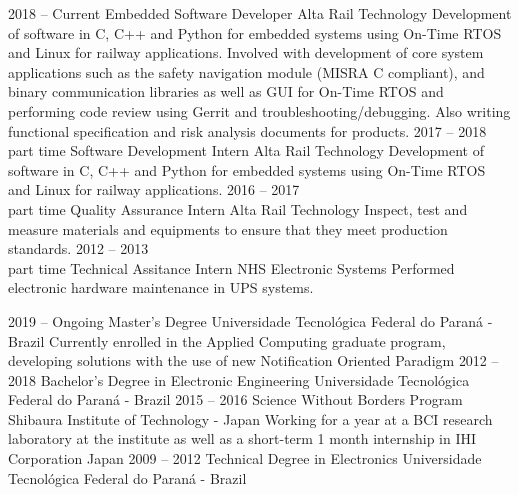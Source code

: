 \documentclass[9pt]{developercv} %
\begin{document}
\begin{entrylist}
	\entry
		{2018 -- Current}
		{Embedded Software Developer}
		{Alta Rail Technology}
		{Development of software in C, C++ and Python for embedded systems using On-Time RTOS and
		Linux for railway applications. Involved with development of core system applications such
		as the safety navigation module (MISRA C compliant), and binary communication libraries as well 
		as GUI for On-Time RTOS and performing code review using Gerrit and troubleshooting/debugging.
		Also writing functional specification and risk analysis documents for products.}
	\entry
		{2017 -- 2018\\\footnotesize{part time}}
		{Software Development Intern}
		{Alta Rail Technology}
		{Development of software in C, C++ and Python for embedded systems using On-Time RTOS and 
		Linux for railway applications.}
	\entry
		{2016 -- 2017\\\footnotesize{part time}}
		{Quality Assurance Intern}
		{Alta Rail Technology}
		{Inspect, test and measure materials and equipments to ensure that they meet production standards.}
	\entry
		{2012 -- 2013\\\footnotesize{part time}}
		{Technical Assitance Intern}
		{NHS Electronic Systems}
		{Performed electronic hardware maintenance in UPS systems.}
\end{entrylist}



\begin{entrylist}
	\entry
		{2019 -- Ongoing}
		{Master's Degree}
		{Universidade Tecnológica Federal do Paraná - Brazil}
		{Currently enrolled in the Applied Computing graduate program, developing solutions
		with the use of new Notification Oriented Paradigm}
	\entry
		{2012 -- 2018}
		{Bachelor's Degree in Electronic Engineering}
		{Universidade Tecnológica Federal do Paraná - Brazil}
		{}
	\entry
		{2015 -- 2016}
		{Science Without Borders Program}
		{Shibaura Institute of Technology - Japan}
		{Working for a year at a BCI research laboratory at the institute as well as a short-term
		1 month internship in IHI Corporation Japan}
	\entry
		{2009 -- 2012}
		{Technical Degree in Electronics}
		{Universidade Tecnológica Federal do Paraná - Brazil}
		{}
\end{entrylist}
\end{document}
